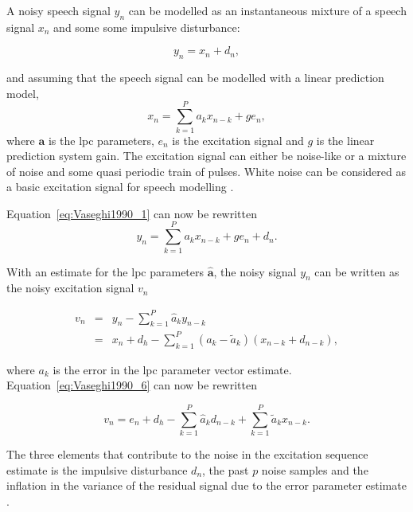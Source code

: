 A noisy speech signal $y_n$ can be modelled as an instantaneous mixture of a speech signal $x_n$ and some some impulsive disturbance:

\begin{equation}\label{eq:Vaseghi1990_1}
y_n = x_n + d_n,
\end{equation}

and assuming that the speech signal can be modelled with a linear prediction model,
\begin{equation}\label{eq:Vaseghi1990_4}
x_n = \sum^P_{k=1} a_k x_{n-k} +ge_n,
\end{equation}
where $\mathbf{a}$ is the \gls{lpc} parameters, $e_n$ is the excitation signal and $g$ is the linear prediction system gain. The excitation signal can either be noise-like or a mixture of noise and some quasi periodic train of pulses. White noise can be considered as a basic excitation signal for speech modelling \cite{Vaseghi1990}.

Equation~\ref{eq:Vaseghi1990_1} can now be rewritten
\begin{equation}\label{eq:Vaseghi1990_5}
y_n = \sum^P_{k=1} a_k x_{n-k} + ge_n + d_n.
\end{equation}

With an estimate for the \gls{lpc} parameters $\mathbf{\hat{a}}$, the noisy signal $y_n$ can be written as the noisy excitation signal $v_n$

\begin{eqnarray}
  v_n &=& y_n - \sum^P_{k=1} \hat{a}_k y_{n-k} \nonumber\\
  &=& x_n + d_h - \sum^P_{k=1} (a_k - \tilde{a}_k)(x_{n-k} + d_{n-k}),\label{eq:Vaseghi1990_6}
\end{eqnarray}

where $a_k$ is the error in the \gls{lpc} parameter vector estimate. Equation~\ref{eq:Vaseghi1990_6} can now be rewritten

\begin{equation}\label{eq:Vaseghi1990_7}
v_n = e_n + d_h - \sum^P_{k=1} \hat{a}_k d_{n-k} + \sum^P_{k=1} \tilde{a}_k x_{n-k}.
\end{equation}

The three elements that contribute to the noise in the excitation sequence estimate is the impulsive disturbance $d_n$, the past $p$ noise samples and the inflation in the variance of the residual signal due to the error parameter estimate \cite{Vaseghi1990}.

